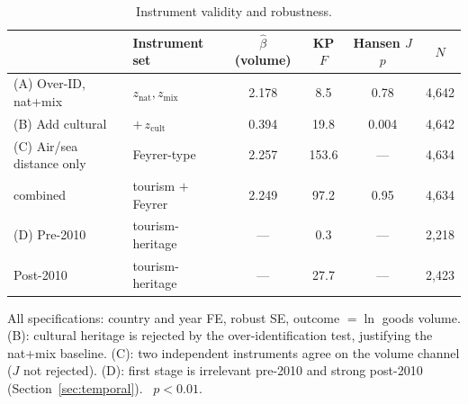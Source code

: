 \begin{table}[H]
\centering
\caption{Instrument validity and robustness.}
\label{tab:robust}
\begin{threeparttable}
\small
\begin{tabular}{llcccc}
\toprule
 & Instrument set & $\hat\beta$ (volume) & KP $F$ & Hansen $J$ $p$ & $N$ \\
\midrule
(A) Over-ID, nat+mix      & $z_{\text{nat}},z_{\text{mix}}$ & 2.178\sym{***} & 8.5 & 0.78 & 4{,}642 \\
(B) Add cultural          & $+\,z_{\text{cult}}$            & 0.394          & 19.8 & 0.004 & 4{,}642 \\
(C) Air/sea distance only & Feyrer-type                     & 2.257\sym{***} & 153.6 & --- & 4{,}634 \\
\quad combined            & tourism $+$ Feyrer              & 2.249\sym{***} & 97.2 & 0.95 & 4{,}634 \\
(D) Pre-2010              & tourism-heritage                & ---            & 0.3 & --- & 2{,}218 \\
\quad Post-2010           & tourism-heritage                & ---            & 27.7 & --- & 2{,}423 \\
\bottomrule
\end{tabular}
\begin{tablenotes}\footnotesize
\item All specifications: country and year FE, robust SE, outcome $=\ln$ goods
volume. (B): cultural heritage is rejected by the over-identification test,
justifying the nat+mix baseline. (C): two independent instruments agree on the
volume channel ($J$ not rejected). (D): first stage is irrelevant pre-2010 and
strong post-2010 (Section~\ref{sec:temporal}).
\sym{***}~$p<0.01$.
\end{tablenotes}
\end{threeparttable}
\end{table}


